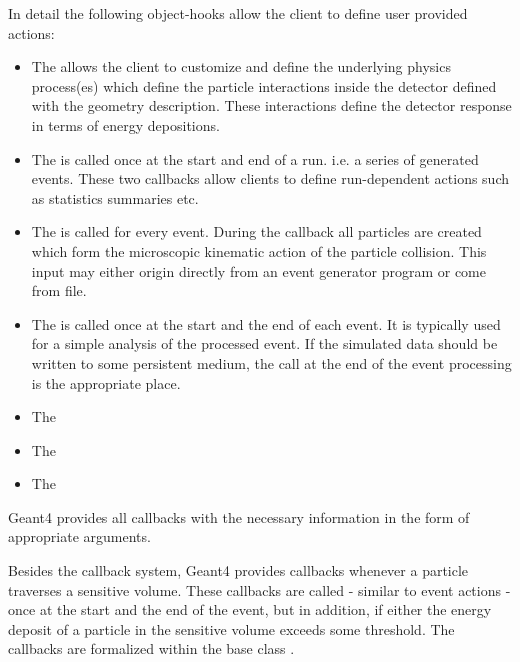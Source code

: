 \noindent
In detail the following object-hooks allow the client to define user provided actions:
\begin{itemize}\itemcompact
\item The  allows the client to customize and define 
    the underlying physics process(es) which define the particle interactions 
    inside the detector defined with the geometry description.
    These interactions define the detector response in terms of 
    energy depositions.
\item The  is called once at the start and end of a run. 
    i.e. a series of generated events. These two callbacks
    allow clients to define run-dependent actions such as statistics
    summaries etc.
\item The  is called for every event.
    During the callback all particles are created which form the 
    microscopic kinematic action of the particle collision.
    This input may either origin directly from an event generator program
    or come from file.
\item The  is called once at the start and the end of each event.
     It is typically used for a simple analysis of the processed event.
     If the simulated data should be written to some persistent medium, 
     the call at the end of the event processing is the appropriate place.
\item The  
\item The  
\item The  
\end{itemize}
\noindent
Geant4 provides all callbacks with the necessary information in the form of 
appropriate arguments.

\noindent
Besides the callback system, Geant4 provides callbacks whenever a particle
traverses a sensitive volume. These callbacks are called 
- similar to event actions - once at the start and the end of the event,
but in addition, if either the energy deposit of a particle in the 
sensitive volume exceeds some threshold. The callbacks are formalized within 
the base class .
